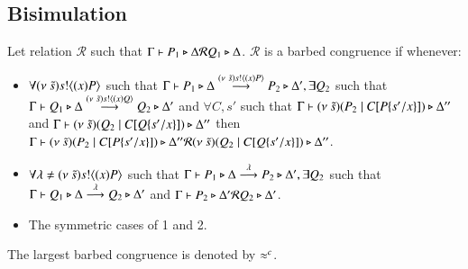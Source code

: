 \subsection{Bisimulation}

\begin{definition}\rm
	Let relation $\mathcal{R}$ such that $\Gamma \vdash P_1 \triangleright \Delta \mathcal{R} Q_1 \triangleright \Delta$.
	$\mathcal{R}$ is a barbed congruence if whenever:
	\begin{itemize}
		\item	$\forall (\nu\ \tilde{s}) s ! \langle (x)P \rangle$ such that $\Gamma \vdash P_1 \triangleright \Delta \stackrel{(\nu\ \tilde{s}) s ! \langle (x)P \rangle}{\longrightarrow} P_2 \triangleright \Delta', \exists
			Q_2$ such that $\Gamma \vdash Q_1 \triangleright \Delta \stackrel{(\nu\ \tilde{s}) s ! \langle (x)Q \rangle}{\longrightarrow} Q_2 \triangleright \Delta'$ and
			$\forall C, s'$ such that $\Gamma \vdash (\nu\ \tilde{s})(P_2 \;|\; C[P \{s'/x \}]) \triangleright \Delta''$ and
			$\Gamma \vdash (\nu\ \tilde{s})(Q_2 \;|\; C[Q \{s'/x \}]) \triangleright \Delta''$ then
			$\Gamma \vdash (\nu\ \tilde{s})(P_2 \;|\; C[P \{s'/x \}]) \triangleright \Delta'' \mathcal{R} (\nu\ \tilde{s})(Q_2 \;|\; C[Q \{s'/x \}]) \triangleright \Delta''$.

		\item	$\forall \lambda \not= (\nu\ \tilde{s}) s ! \langle (x)P \rangle$ such that $\Gamma \vdash P_1 \triangleright \Delta \stackrel{\lambda}{\longrightarrow} P_2 \triangleright \Delta', \exists
			Q_2$ such that $\Gamma \vdash Q_1 \triangleright \Delta \stackrel{\lambda}{\longrightarrow} Q_2 \triangleright \Delta'$ and
			$\Gamma \vdash P_2 \triangleright \Delta' \mathcal{R} Q_2 \triangleright \Delta'$.

		\item	The symmetric cases of 1 and 2.
	\end{itemize}
	The largest barbed congruence is denoted by $\approx^c$.
\end{definition}


